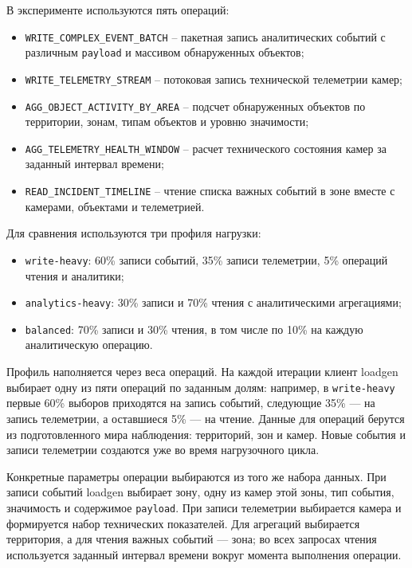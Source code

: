 В эксперименте используются пять операций:

\begin{itemize}
  \item \texttt{WRITE\_COMPLEX\_EVENT\_BATCH} -- пакетная запись аналитических
        событий с различным \texttt{payload} и массивом обнаруженных
        объектов;
  \item \texttt{WRITE\_TELEMETRY\_STREAM} -- потоковая запись технической
        телеметрии камер;
  \item \texttt{AGG\_OBJECT\_ACTIVITY\_BY\_AREA} -- подсчет обнаруженных
        объектов по территории, зонам, типам объектов и уровню значимости;
  \item \texttt{AGG\_TELEMETRY\_HEALTH\_WINDOW} -- расчет технического
        состояния камер за заданный интервал времени;
  \item \texttt{READ\_INCIDENT\_TIMELINE} -- чтение списка важных событий
        в зоне вместе с камерами, объектами и телеметрией.
\end{itemize}

Для сравнения используются три профиля нагрузки:

\begin{itemize}
  \item \texttt{write-heavy}: 60\% записи событий, 35\% записи телеметрии,
        5\% операций чтения и аналитики;
  \item \texttt{analytics-heavy}: 30\% записи и 70\% чтения с аналитическими
        агрегациями;
  \item \texttt{balanced}: 70\% записи и 30\% чтения, в том числе по 10\%
        на каждую аналитическую операцию.
\end{itemize}

Профиль наполняется через веса операций. На каждой итерации клиент loadgen
выбирает одну из пяти операций по заданным долям: например, в
\texttt{write-heavy} первые 60\% выборов приходятся на запись событий,
следующие 35\% --- на запись телеметрии, а оставшиеся 5\% --- на чтение.
Данные для операций берутся из подготовленного мира наблюдения: территорий,
зон и камер. Новые события и записи телеметрии создаются уже во время
нагрузочного цикла.

Конкретные параметры операции выбираются из того же набора данных. При записи
событий loadgen выбирает зону, одну из камер этой зоны, тип события,
значимость и содержимое \texttt{payload}. При записи телеметрии выбирается
камера и формируется набор технических показателей. Для агрегаций выбирается
территория, а для чтения важных событий --- зона; во всех запросах чтения
используется заданный интервал времени вокруг момента выполнения операции.

